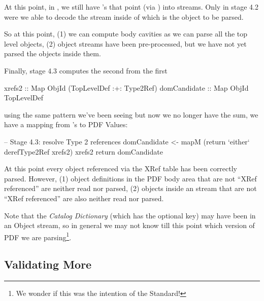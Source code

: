 At this point, in , we still have 's that point
(via ) into  streams.
Only in stage 4.2 were we able to decode the stream inside of
which is the object to be parsed.


So at this point, (1) we can compute body cavities  as
we can parse all the top level objects, (2) object streams have been
pre-processed, but we have not yet parsed the objects inside them.

Finally, stage 4.3 computes the second from the first
\begin{codeNoExecute}
  xrefs2       :: Map ObjId (TopLevelDef :+: Type2Ref) 
  domCandidate :: Map ObjId TopLevelDef
\end{codeNoExecute}
using the same pattern we've been seeing but now we no longer have 
the sum, we have a mapping from 's to PDF Values:
\begin{code}
    -- Stage 4.3: resolve Type 2 references
    domCandidate <- mapM
                     (return `either` derefType2Ref xrefs2)
                     xrefs2
    return domCandidate
\end{code}

At this point every object referenced via the XRef table has been
correctly parsed. However, (1) object definitions in the PDF body
area that are not ``XRef referenced'' are neither read nor parsed,
% 
(2) objects inside an  stream that are not ``XRef
referenced'' are also neither read nor parsed.

Note that the \emph{Catalog Dictionary} (which has the optional
 key) may have been in an Object stream, so in general
we may not know till this point which version of PDF we are
parsing\footnote{We wonder if this was the intention of the Standard!}.

\subsection{Validating More}
\label{sec:validating}



